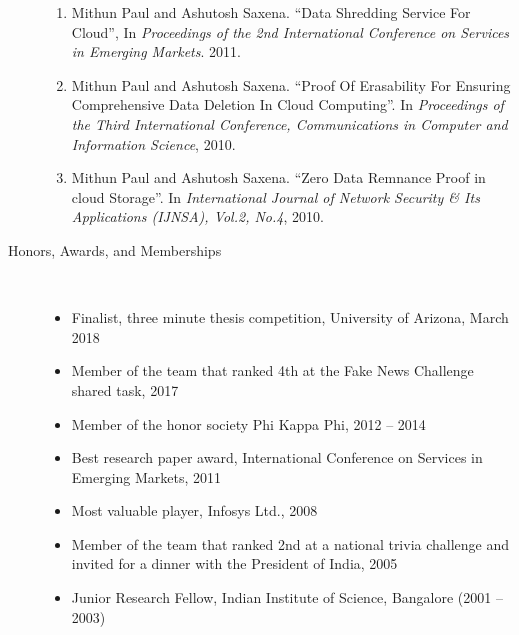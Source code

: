 \documentclass[10pt]{article}
\newcommand{\ve}[1]{{\em #1}} %
\newcommand{\ti}[1]{``#1''} %
\begin{document}
\begin{description}
\begin{enumerate}
\item  Mithun Paul and Ashutosh Saxena.   \ti{Data Shredding Service For Cloud}, In \ve{  Proceedings of the 2nd International Conference on Services in Emerging Markets}. 2011.

\item  Mithun Paul and Ashutosh Saxena.   \ti{Proof Of Erasability For Ensuring Comprehensive Data Deletion In Cloud Computing}. In \ve{  Proceedings of the Third International Conference, Communications in Computer and Information Science}, 2010.

\item  Mithun Paul and Ashutosh Saxena.   \ti{Zero Data Remnance Proof in cloud Storage}. In \ve{  International Journal of Network Security \& Its Applications (IJNSA), Vol.2, No.4}, 2010.




\end{enumerate}





\bigskip

\vspace{-.3cm}
\item [Honors, Awards, and Memberships]\
\begin{itemize}
\itemsep-1em
\item Finalist, three minute thesis competition, University of Arizona, March 2018\\

\item Member of the team that ranked 4th at the Fake News Challenge shared task, 2017\\
\item Member of the honor society Phi Kappa Phi, 2012 -- 2014\\
\item Best research paper award, International Conference on Services in Emerging Markets, 2011\\
\item Most valuable player,  Infosys  Ltd., 2008\\
\item Member of the team that ranked 2nd at a national trivia challenge and invited for a dinner with the President of India, 2005\\
\item Junior Research Fellow, Indian Institute of Science, Bangalore (2001 – 2003)\\

\end{itemize}



\end{description}
\end{document}
